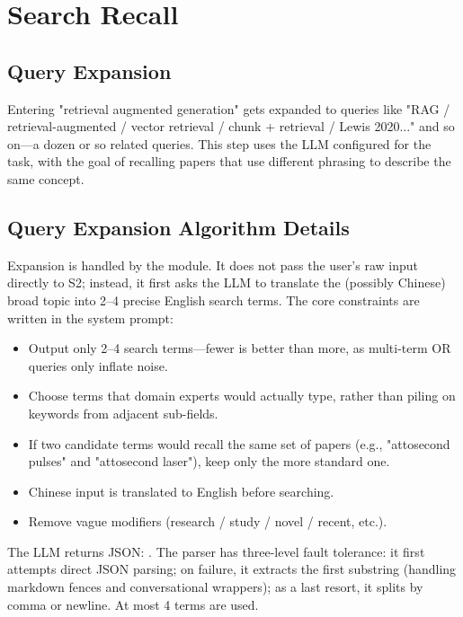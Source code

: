 \section{Search Recall}


\subsection{Query Expansion}

Entering "retrieval augmented generation" gets expanded to queries like "RAG / retrieval-augmented
/ vector retrieval / chunk + retrieval / Lewis 2020..." and so on---a dozen or so related queries.
This step uses the LLM configured for the  task, with the goal of recalling papers that
use different phrasing to describe the same concept.

\subsection{Query Expansion Algorithm Details}

Expansion is handled by the  module. It does not pass the user's raw input
directly to S2; instead, it first asks the LLM to translate the (possibly Chinese) broad topic
into 2--4 precise English search terms. The core constraints are written in the system prompt:

\begin{itemize}
  \item Output only 2--4 search terms---fewer is better than more, as multi-term OR queries only
    inflate noise.
  \item Choose terms that domain experts would actually type, rather than piling on keywords from
    adjacent sub-fields.
  \item If two candidate terms would recall the same set of papers (e.g., "attosecond pulses" and
    "attosecond laser"), keep only the more standard one.
  \item Chinese input is translated to English before searching.
  \item Remove vague modifiers (research / study / novel / recent, etc.).
\end{itemize}

The LLM returns JSON: . The parser has three-level fault tolerance: it
first attempts direct JSON parsing; on failure, it extracts the first  substring
(handling markdown fences and conversational wrappers); as a last resort, it splits by comma or
newline. At most 4 terms are used.


